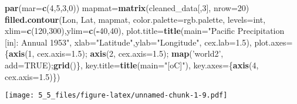 \documentclass[]{article}
\newenvironment{Shaded}{\begin{snugshade}}{\end{snugshade}}
\newcommand{\KeywordTok}[1]{\textcolor[rgb]{0.13,0.29,0.53}{\textbf{#1}}}
\newcommand{\DataTypeTok}[1]{\textcolor[rgb]{0.13,0.29,0.53}{#1}}
\newcommand{\DecValTok}[1]{\textcolor[rgb]{0.00,0.00,0.81}{#1}}
\newcommand{\FloatTok}[1]{\textcolor[rgb]{0.00,0.00,0.81}{#1}}
\newcommand{\StringTok}[1]{\textcolor[rgb]{0.31,0.60,0.02}{#1}}
\newcommand{\OtherTok}[1]{\textcolor[rgb]{0.56,0.35,0.01}{#1}}
\newcommand{\OperatorTok}[1]{\textcolor[rgb]{0.81,0.36,0.00}{\textbf{#1}}}
\newcommand{\NormalTok}[1]{#1}
\begin{document}
\begin{Shaded}
\begin{Highlighting}[]
\KeywordTok{par}\NormalTok{(}\DataTypeTok{mar=}\KeywordTok{c}\NormalTok{(}\DecValTok{4}\NormalTok{,}\DecValTok{5}\NormalTok{,}\DecValTok{3}\NormalTok{,}\DecValTok{0}\NormalTok{))}
\NormalTok{mapmat=}\KeywordTok{matrix}\NormalTok{(cleaned_data[,}\DecValTok{3}\NormalTok{], }\DataTypeTok{nrow=}\DecValTok{20}\NormalTok{)}
\KeywordTok{filled.contour}\NormalTok{(Lon, Lat, mapmat, }\DataTypeTok{color.palette=}\NormalTok{rgb.palette, }\DataTypeTok{levels=}\NormalTok{int,}
               \DataTypeTok{xlim=}\KeywordTok{c}\NormalTok{(}\DecValTok{120}\NormalTok{,}\DecValTok{300}\NormalTok{),}\DataTypeTok{ylim=}\KeywordTok{c}\NormalTok{(}\OperatorTok{-}\DecValTok{40}\NormalTok{,}\DecValTok{40}\NormalTok{),}
               \DataTypeTok{plot.title=}\KeywordTok{title}\NormalTok{(}\DataTypeTok{main=}\StringTok{"Pacific Precipitation [in]: Annual 1953"}\NormalTok{,}
                                \DataTypeTok{xlab=}\StringTok{"Latitude"}\NormalTok{,}\DataTypeTok{ylab=}\StringTok{"Longitude"}\NormalTok{, }\DataTypeTok{cex.lab=}\FloatTok{1.5}\NormalTok{),}
               \DataTypeTok{plot.axes=}\NormalTok{\{}\KeywordTok{axis}\NormalTok{(}\DecValTok{1}\NormalTok{, }\DataTypeTok{cex.axis=}\FloatTok{1.5}\NormalTok{); }\KeywordTok{axis}\NormalTok{(}\DecValTok{2}\NormalTok{, }\DataTypeTok{cex.axis=}\FloatTok{1.5}\NormalTok{);}
                 \KeywordTok{map}\NormalTok{(}\StringTok{'world2'}\NormalTok{, }\DataTypeTok{add=}\OtherTok{TRUE}\NormalTok{);}\KeywordTok{grid}\NormalTok{()\},}
               \DataTypeTok{key.title=}\KeywordTok{title}\NormalTok{(}\DataTypeTok{main=}\StringTok{"[oC]"}\NormalTok{),}
               \DataTypeTok{key.axes=}\NormalTok{\{}\KeywordTok{axis}\NormalTok{(}\DecValTok{4}\NormalTok{, }\DataTypeTok{cex.axis=}\FloatTok{1.5}\NormalTok{)\})}
\end{Highlighting}
\end{Shaded}

\texttt{[image: 5\_5\_files/figure-latex/unnamed-chunk-1-9.pdf]}
\end{document}
